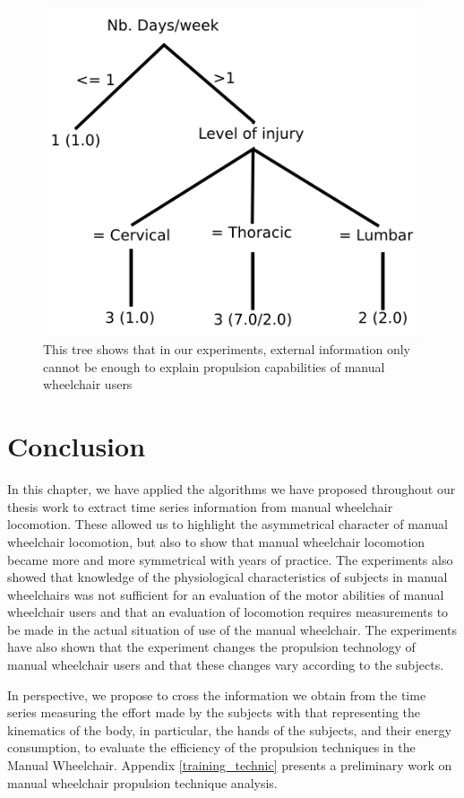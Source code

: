 \begin{figure}[h]
\center
\includegraphics[scale = 0.6]{images/arbre_physio_motor}
\caption{This tree shows that in our experiments, external information only cannot be enough to explain propulsion capabilities of manual wheelchair users}
\label{physio_tree}
\end{figure}


\section{Conclusion}

In this chapter, we have applied the algorithms we have proposed throughout our thesis work to extract time series information from manual wheelchair locomotion. These allowed us to highlight the asymmetrical character of manual wheelchair locomotion, but also to show that manual wheelchair locomotion became more and more symmetrical with years of practice. The experiments also showed that knowledge of the physiological characteristics of subjects in manual wheelchairs was not sufficient for an evaluation of the motor abilities of manual wheelchair users and that an evaluation of locomotion requires measurements to be made in the actual situation of use of the manual wheelchair. The experiments have also shown that the experiment changes the propulsion technology of manual wheelchair users and that these changes vary according to the subjects.


In perspective, we propose to cross the information we obtain from the time series measuring the effort made by the subjects with that representing the kinematics of the body, in particular, the hands of the subjects, and their energy consumption, to evaluate the efficiency of the propulsion techniques in the Manual Wheelchair. Appendix \ref{training_technic} presents a preliminary work on manual wheelchair propulsion technique analysis.


